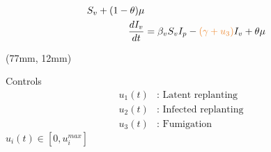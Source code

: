 \begin{frame}{}
\begin{textblock*}{72mm}
\begin{bluebox}{}
{\begin{align*}
                        S_v + (1-\theta)\mu
                        \\
                    \frac{dI_v}{dt} &=
                        \beta_v S_v I_p - 
                        \textcolor{cadmiumorange}{(\gamma + u_3)} I_v 
                        + \theta\mu
                \end{align*}
            }
        \tcblower
        \end{bluebox}
    \end{textblock*}
    \begin{textblock*}{45mm}(77mm, 12mm)
        \begin{yellowbox}{Controls}
            \begin{align*}
                u_1(t)&:
                    \text{ Latent replanting}
                \\
                u_2(t)&:
                    \text{ Infected replanting}
                \\
                u_3(t)&:
                    \text{ Fumigation}
            \end{align*}
        \tcblower
        $u_i(t) \in  [0, u_i^{max}]$
        \end{yellowbox}
    \end{textblock*}
\end{frame}
